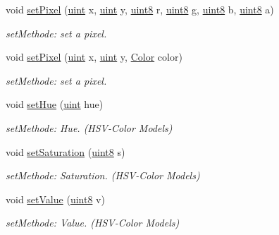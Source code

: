 \begin{DoxyCompactItemize}
void \hyperlink{class_f2_c_1_1_bitmap_ad91aa72b9159925e6b09a13f408a603d}{setPixel} (\hyperlink{namespace_f2_c_a58be2bac9eb3e3c99cb41b6008bf4fae}{uint} x, \hyperlink{namespace_f2_c_a58be2bac9eb3e3c99cb41b6008bf4fae}{uint} y, \hyperlink{namespace_f2_c_a711deb33697d145669b9c0c4fe87c7ca}{uint8} r, \hyperlink{namespace_f2_c_a711deb33697d145669b9c0c4fe87c7ca}{uint8} g, \hyperlink{namespace_f2_c_a711deb33697d145669b9c0c4fe87c7ca}{uint8} b, \hyperlink{namespace_f2_c_a711deb33697d145669b9c0c4fe87c7ca}{uint8} a)
\begin{DoxyCompactList}\small\item\em setMethode: set a pixel. \item\end{DoxyCompactList}\item 
void \hyperlink{class_f2_c_1_1_bitmap_ada18c311c9e0cd0ba4c413b7cce2fb62}{setPixel} (\hyperlink{namespace_f2_c_a58be2bac9eb3e3c99cb41b6008bf4fae}{uint} x, \hyperlink{namespace_f2_c_a58be2bac9eb3e3c99cb41b6008bf4fae}{uint} y, \hyperlink{class_f2_c_1_1_color}{Color} color)
\begin{DoxyCompactList}\small\item\em setMethode: set a pixel. \item\end{DoxyCompactList}\item 
void \hyperlink{class_f2_c_1_1_bitmap_aaa06d532deca94bc4c655951a137c49a}{setHue} (\hyperlink{namespace_f2_c_a58be2bac9eb3e3c99cb41b6008bf4fae}{uint} hue)
\begin{DoxyCompactList}\small\item\em setMethode: Hue. (HSV-\/Color Models) \item\end{DoxyCompactList}\item 
void \hyperlink{class_f2_c_1_1_bitmap_aa97d0cc8fb9421dff34cf5033becd3cc}{setSaturation} (\hyperlink{namespace_f2_c_a711deb33697d145669b9c0c4fe87c7ca}{uint8} s)
\begin{DoxyCompactList}\small\item\em setMethode: Saturation. (HSV-\/Color Models) \item\end{DoxyCompactList}\item 
void \hyperlink{class_f2_c_1_1_bitmap_ae7292dbd7e0c1230eb7832c536327126}{setValue} (\hyperlink{namespace_f2_c_a711deb33697d145669b9c0c4fe87c7ca}{uint8} v)
\begin{DoxyCompactList}\small\item\em setMethode: Value. (HSV-\/Color Models) \item\end{DoxyCompactList}\item 

\end{DoxyCompactItemize}
